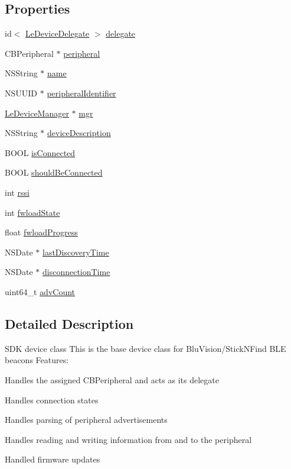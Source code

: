 \subsection*{Properties}
\begin{DoxyCompactItemize}
\item 
id$<$ \hyperlink{protocol_le_device_delegate-p}{Le\+Device\+Delegate} $>$ \hyperlink{interface_le_device_a2abdc1b24d840bccd2f8bb590e726306}{delegate}
\item 
C\+B\+Peripheral $\ast$ \hyperlink{interface_le_device_a203e77150872db0b9cdb0c2e508de5e3}{peripheral}
\item 
N\+S\+String $\ast$ \hyperlink{interface_le_device_a0a263256daa735d19c989c6d884602a2}{name}
\item 
N\+S\+U\+U\+I\+D $\ast$ \hyperlink{interface_le_device_ab2c8f700f9c63c327cfefa48df85caaa}{peripheral\+Identifier}
\item 
\hyperlink{interface_le_device_manager}{Le\+Device\+Manager} $\ast$ \hyperlink{interface_le_device_a53fa330659e8fb767bdb4eec7cff451c}{mgr}
\item 
N\+S\+String $\ast$ \hyperlink{interface_le_device_af434656f02c5a0db4cb796338be698f8}{device\+Description}
\item 
B\+O\+O\+L \hyperlink{interface_le_device_ac8c47eb882711a02628064671e821b49}{is\+Connected}
\item 
B\+O\+O\+L \hyperlink{interface_le_device_a09b98b7f29cabb5a1e7a2b850457c27b}{should\+Be\+Connected}
\item 
int \hyperlink{interface_le_device_a79b699be0bd017548d1b3537fd2c9f6a}{rssi}
\item 
int \hyperlink{interface_le_device_a56486348e92a0d5807a47e306a1cecd3}{fwload\+State}
\item 
float \hyperlink{interface_le_device_a6369f54b2d1aea6a257483e9021499fc}{fwload\+Progress}
\item 
N\+S\+Date $\ast$ \hyperlink{interface_le_device_aea2379826199ce57353813b072bb4fe3}{last\+Discovery\+Time}
\item 
N\+S\+Date $\ast$ \hyperlink{interface_le_device_a946e776be58c2aa7832d11821cd3081a}{disconnection\+Time}
\item 
uint64\+\_\+t \hyperlink{interface_le_device_a04b9cd5e0dfe0ac4f1c1019c22a9b26f}{adv\+Count}
\end{DoxyCompactItemize}


\subsection{Detailed Description}
S\+D\+K device class This is the base device class for Blu\+Vision/\+Stick\+N\+Find B\+L\+E beacons Features\+:
\begin{DoxyItemize}
\item Handles the assigned C\+B\+Peripheral and acts as its delegate
\item Handles connection states
\item Handles parsing of peripheral advertisements
\item Handles reading and writing information from and to the peripheral
\item Handled firmware updates 
\end{DoxyItemize}

